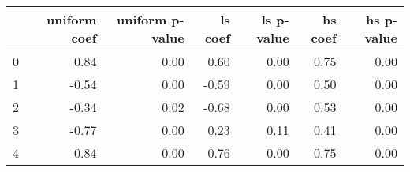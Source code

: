 \begin{tabular}{lrrrrrr}
\toprule
 & uniform coef & uniform p-value & ls coef & ls p-value & hs coef & hs p-value \\
\midrule
0 & 0.84 & 0.00 & 0.60 & 0.00 & 0.75 & 0.00 \\
1 & -0.54 & 0.00 & -0.59 & 0.00 & 0.50 & 0.00 \\
2 & -0.34 & 0.02 & -0.68 & 0.00 & 0.53 & 0.00 \\
3 & -0.77 & 0.00 & 0.23 & 0.11 & 0.41 & 0.00 \\
4 & 0.84 & 0.00 & 0.76 & 0.00 & 0.75 & 0.00 \\
\bottomrule
\end{tabular}
